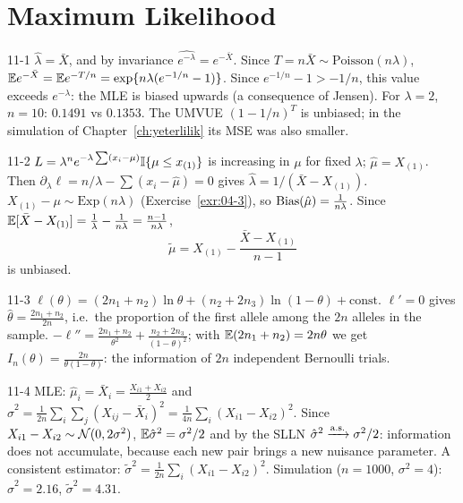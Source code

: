 
\section{Maximum Likelihood}

\begin{solution}{11-1}
$\hat\lambda=\bar X$, and by invariance $\widehat{e^{-\lambda}}=e^{-\bar X}$. Since $T=n\bar X\sim\text{Poisson}(n\lambda)$, $\mathbb{E} e^{-\bar X}=\mathbb{E} e^{-T/n}=\exp\{n\lambda(e^{-1/n}-1)\}$. Since $e^{-1/n}-1>-1/n$, this value exceeds $e^{-\lambda}$: the MLE is biased upwards (a consequence of Jensen). For $\lambda=2$, $n=10$: $0.1491$ vs $0.1353$. The UMVUE $(1-1/n)^T$ is unbiased; in the simulation of Chapter~\ref{ch:yeterlilik} its MSE was also smaller.
\end{solution}

\begin{solution}{11-2}
$L=\lambda^ne^{-\lambda\sum(x_i-\mu)}\mathbb{I}\{\mu\le x_{(1)}\}$ is increasing in $\mu$ for fixed $\lambda$; $\hat\mu=X_{(1)}$. Then $\partial_\lambda\ell=n/\lambda-\sum(x_i-\hat\mu)=0$ gives $\hat\lambda=1/(\bar X-X_{(1)})$. $X_{(1)}-\mu\sim\text{Exp}(n\lambda)$ (Exercise~\ref{exr:04-3}), so $\operatorname{Bias}(\hat\mu)=\frac{1}{n\lambda}$. Since $\mathbb{E}[\bar X-X_{(1)}]=\frac1\lambda-\frac{1}{n\lambda}=\frac{n-1}{n\lambda}$,
\[
\tilde\mu=X_{(1)}-\frac{\bar X-X_{(1)}}{n-1}
\]
is unbiased.
\end{solution}

\begin{solution}{11-3}
$\ell(\theta)=(2n_1+n_2)\ln\theta+(n_2+2n_3)\ln(1-\theta)+\text{const}$. $\ell'=0$ gives $\hat\theta=\frac{2n_1+n_2}{2n}$, i.e.\ the proportion of the first allele among the $2n$ alleles in the sample. $-\ell''=\frac{2n_1+n_2}{\theta^2}+\frac{n_2+2n_3}{(1-\theta)^2}$; with $\mathbb{E}(2n_1+n_2)=2n\theta$ we get $I_n(\theta)=\frac{2n}{\theta(1-\theta)}$: the information of $2n$ independent Bernoulli trials.
\end{solution}

\begin{solution}{11-4}
MLE: $\hat\mu_i=\bar X_i=\frac{X_{i1}+X_{i2}}2$ and $\hat\sigma^2=\frac{1}{2n}\sum_i\sum_j(X_{ij}-\bar X_i)^2=\frac{1}{4n}\sum_i(X_{i1}-X_{i2})^2$. Since $X_{i1}-X_{i2}\sim\mathcal{N}(0,2\sigma^2)$, $\mathbb{E}\hat\sigma^2=\sigma^2/2$ and by the SLLN $\hat\sigma^2\xrightarrow{\text{a.s.}}\sigma^2/2$: information does not accumulate, because each new pair brings a new nuisance parameter. A consistent estimator: $\tilde\sigma^2=\frac{1}{2n}\sum_i(X_{i1}-X_{i2})^2$. Simulation ($n=1000$, $\sigma^2=4$): $\hat\sigma^2=2.16$, $\tilde\sigma^2=4.31$.
\end{solution}

